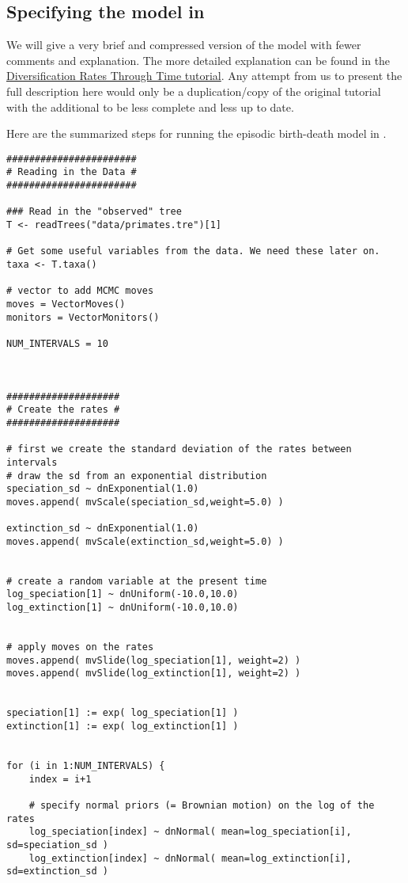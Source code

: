 \subsection{Specifying the model in \Rev}
We will give a very brief and compressed version of the model with fewer comments and explanation.
The more detailed explanation can be found in the \href{https://github.com/revbayes/revbayes_tutorial/raw/master/tutorial_TeX/RB_DiversificationRate_Episodic_Tutorial/RB_DiversificationRate_Episodic_Tutorial.pdf}{Diversification Rates Through Time tutorial}.
Any attempt from us to present the full description here would only be a duplication/copy of the original tutorial with the additional to be less complete and less up to date.


Here are the summarized steps for running the episodic birth-death model in \Rev.
{\tt \begin{snugshade*}
\begin{lstlisting}
#######################
# Reading in the Data #
#######################

### Read in the "observed" tree
T <- readTrees("data/primates.tre")[1]

# Get some useful variables from the data. We need these later on.
taxa <- T.taxa()

# vector to add MCMC moves
moves = VectorMoves()
monitors = VectorMonitors()

NUM_INTERVALS = 10



####################
# Create the rates #
####################

# first we create the standard deviation of the rates between intervals
# draw the sd from an exponential distribution
speciation_sd ~ dnExponential(1.0)
moves.append( mvScale(speciation_sd,weight=5.0) )

extinction_sd ~ dnExponential(1.0)
moves.append( mvScale(extinction_sd,weight=5.0) )


# create a random variable at the present time
log_speciation[1] ~ dnUniform(-10.0,10.0)
log_extinction[1] ~ dnUniform(-10.0,10.0)


# apply moves on the rates
moves.append( mvSlide(log_speciation[1], weight=2) )
moves.append( mvSlide(log_extinction[1], weight=2) )


speciation[1] := exp( log_speciation[1] )
extinction[1] := exp( log_extinction[1] )


for (i in 1:NUM_INTERVALS) {
    index = i+1
    
    # specify normal priors (= Brownian motion) on the log of the rates
    log_speciation[index] ~ dnNormal( mean=log_speciation[i], sd=speciation_sd )
    log_extinction[index] ~ dnNormal( mean=log_extinction[i], sd=extinction_sd )


\end{lstlisting}
\end{snugshade*}}
